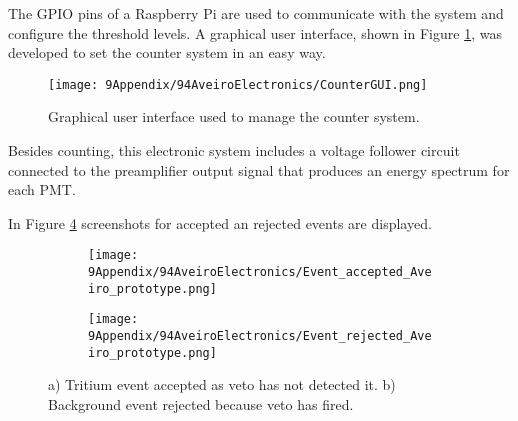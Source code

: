\begin{enumerate}
The GPIO pins of a Raspberry Pi are used to communicate with the system and configure the threshold levels. A graphical user interface, shown in Figure \ref{fig:GUIcounts}, was developed to set the counter system in an easy way.

 \begin{figure}[h]
\centering
\texttt{[image: 9Appendix/94AveiroElectronics/CounterGUI.png]}
\caption{Graphical user interface used to manage the counter system. \label{fig:GUIcounts}}
\end{figure}

Besides counting, this electronic system includes a voltage follower circuit connected to the preamplifier output signal that produces an energy spectrum for each PMT.


In Figure \ref{fig:ScreenshotElectronic} screenshots for accepted an rejected events are displayed.


\begin{figure}
\centering
    \begin{subfigure}[b]{0.42\textwidth}
    \centering
    \texttt{[image: 9Appendix/94AveiroElectronics/Event\_accepted\_Aveiro\_prototype.png]}  
    \caption{\label{subfig:TrueTritiumEvent}}
    \end{subfigure}
    \hfill
    \begin{subfigure}[b]{0.42\textwidth}
    \centering
    \texttt{[image: 9Appendix/94AveiroElectronics/Event\_rejected\_Aveiro\_prototype.png]}  
    \caption{\label{subfig:FalseTritiumEvent}}
    \end{subfigure}
 \caption{a) Tritium event accepted as veto has not detected it. b) Background event rejected because veto has fired.}
 \label{fig:ScreenshotElectronic}
\end{figure}


\end{enumerate}
